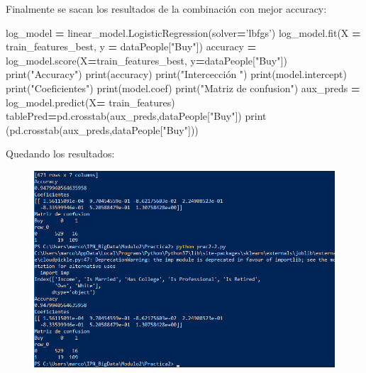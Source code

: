 \documentclass[]{article}
\newenvironment{Shaded}{\begin{snugshade}}{\end{snugshade}}
\newcommand{\StringTok}[1]{\textcolor[rgb]{0.31,0.60,0.02}{#1}}
\newcommand{\OperatorTok}[1]{\textcolor[rgb]{0.81,0.36,0.00}{\textbf{#1}}}
\newcommand{\BuiltInTok}[1]{#1}
\newcommand{\NormalTok}[1]{#1}
\begin{document}
Finalmente se sacan los resultados de la combinación con mejor accuracy:

\begin{Shaded}
\begin{Highlighting}[]
\NormalTok{log_model }\OperatorTok{=}\NormalTok{ linear_model.LogisticRegression(solver}\OperatorTok{=}\StringTok{'lbfgs'}\NormalTok{)}
\NormalTok{log_model.fit(X }\OperatorTok{=}\NormalTok{ train_features_best, y }\OperatorTok{=}\NormalTok{ dataPeople[}\StringTok{"Buy"}\NormalTok{])}
\NormalTok{accuracy  }\OperatorTok{=}\NormalTok{ log_model.score(X}\OperatorTok{=}\NormalTok{train_features_best, y}\OperatorTok{=}\NormalTok{dataPeople[}\StringTok{"Buy"}\NormalTok{])}
\BuiltInTok{print}\NormalTok{(}\StringTok{"Accuracy"}\NormalTok{)}
\BuiltInTok{print}\NormalTok{(accuracy)}
\BuiltInTok{print}\NormalTok{(}\StringTok{"Intercección "}\NormalTok{)}
\BuiltInTok{print}\NormalTok{(model.intercept)}
\BuiltInTok{print}\NormalTok{(}\StringTok{"Coeficientes"}\NormalTok{)}
\BuiltInTok{print}\NormalTok{(model.coef)}
\BuiltInTok{print}\NormalTok{(}\StringTok{"Matriz de confusion"}\NormalTok{)}
\NormalTok{aux_preds }\OperatorTok{=}\NormalTok{ log_model.predict(X}\OperatorTok{=}\NormalTok{ train_features)}
\NormalTok{tablePred}\OperatorTok{=}\NormalTok{pd.crosstab(aux_preds,dataPeople[}\StringTok{"Buy"}\NormalTok{])}
\BuiltInTok{print}\NormalTok{ (pd.crosstab(aux_preds,dataPeople[}\StringTok{"Buy"}\NormalTok{]))}
\end{Highlighting}
\end{Shaded}

Quedando los resultados:

\begin{figure}[htbp]
\centering
\includegraphics{resultados.png}
\end{figure}
\end{document}
